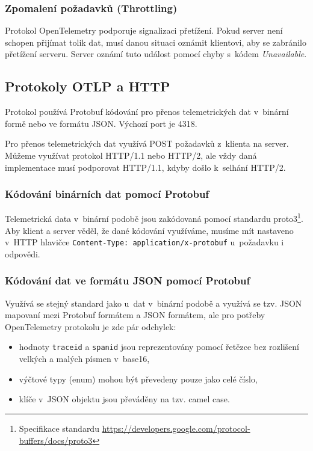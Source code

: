 \subsubsection{Zpomalení požadavků (Throttling)}
Protokol OpenTelemetry podporuje signalizaci přetížení. Pokud server není schopen přijímat tolik dat, musí danou situaci oznámit klientovi, aby se zabránilo přetížení serveru. Server oznámí tuto událost pomocí chyby s~kódem \textit{Unavailable}.

\subsection{Protokoly OTLP a HTTP}
Protokol používá Protobuf kódování pro přenos telemetrických dat v~binární formě nebo ve formátu JSON. Výchozí port je 4318. 

Pro přenos telemetrických dat využívá POST požadavků z~klienta na server. Můžeme využívat protokol HTTP/1.1 nebo HTTP/2, ale vždy daná implementace musí podporovat HTTP/1.1, kdyby došlo k~selhání HTTP/2.

\subsubsection{Kódování binárních dat pomocí Protobuf}
Telemetrická data v~binární podobě jsou zakódovaná pomocí standardu proto3\footnote{Specifikace standardu \url{https://developers.google.com/protocol-buffers/docs/proto3}}. Aby klient a server věděl, že dané kódování využíváme, musíme mít nastaveno v~HTTP hlavičce \texttt{Content-Type: application/x-protobuf} u~požadavku i odpovědi.

\subsubsection{Kódování dat ve formátu JSON pomocí Protobuf}
Využívá se stejný standard jako u~dat v~binární podobě a využívá se tzv. JSON mapovaní mezi Protobuf formátem a JSON formátem, ale pro potřeby OpenTelemetry protokolu je zde pár odchylek:
\begin{itemize}
        \item{hodnoty \texttt{trace\textunderscore id} a \texttt{span\textunderscore id} jsou reprezentovány pomocí řetězce bez rozlišení velkých a malých písmen v~base16\protect\footnotemark,}
        \item{výčtové typy (enum) mohou být převedeny pouze jako celé číslo,}
        \item{klíče v~JSON objektu jsou převáděny na tzv. camel case.}
\end{itemize}

